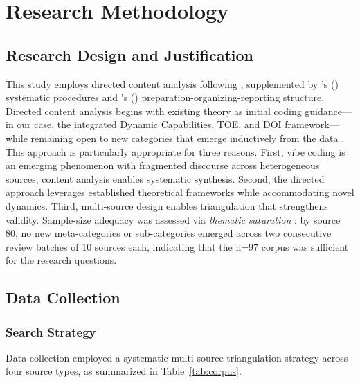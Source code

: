 \documentclass[preprint,12pt,authoryear]{elsarticle}
\begin{document}
\section{Research Methodology}
\label{sec:methodology}

\subsection{Research Design and Justification}

This study employs directed content analysis following \citet{Hsieh2005}, supplemented by \citeauthor{Mayring2014}'s (\citeyear{Mayring2014}) systematic procedures and \citeauthor{Elo2008}'s (\citeyear{Elo2008}) preparation-organizing-reporting structure. Directed content analysis begins with existing theory as initial coding guidance---in our case, the integrated Dynamic Capabilities, TOE, and DOI framework---while remaining open to new categories that emerge inductively from the data \citep{Hsieh2005}. This approach is particularly appropriate for three reasons. First, vibe coding is an emerging phenomenon with fragmented discourse across heterogeneous sources; content analysis enables systematic synthesis. Second, the directed approach leverages established theoretical frameworks while accommodating novel dynamics. Third, multi-source design enables triangulation that strengthens validity. Sample-size adequacy was assessed via \emph{thematic saturation} \citep{Saunders2018}: by source 80, no new meta-categories or sub-categories emerged across two consecutive review batches of 10 sources each, indicating that the n=97 corpus was sufficient for the research questions.


\subsection{Data Collection}
\label{sec:data-collection}

\subsubsection{Search Strategy}

Data collection employed a systematic multi-source triangulation strategy across four source types, as summarized in Table~\ref{tab:corpus}.
\end{document}
